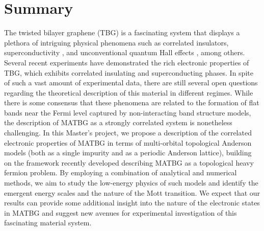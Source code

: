 \documentclass[12pt]{report}
\begin{document}
%
%
\geraTitulo
%
\folhaDeRosto
%
%
%
\tableofcontents
\thispagestyle{empty}
\clearpage
%

\sectionfont{\scshape}



\chapter{Summary} \label{chp:abstract}

The twisted bilayer graphene (TBG) is a fascinating system that displays a plethora of intriguing physical phenomena such as correlated insulators, superconductivity \cite{cao2018}, and unconventional quantum Hall effects \cite{unconv_QHE_tbg_2006}, among others. Several recent experiments have demonstrated the rich electronic properties of TBG, which exhibits correlated insulating and superconducting phases. In spite of such a vast amount of experimental data, there are still several open questions regarding the theoretical description of this material in different regimes. While there is some consensus that these phenomena are related to the formation of flat bands near the Fermi level captured by non-interacting band structure models, the description of MATBG as a strongly correlated system is nonetheless challenging. In this Master's project, we propose a description of the correlated electronic properties of MATBG in terms of multi-orbital topological Anderson models (both as a single impurity and as a periodic Anderson lattice), building on the framework recently developed describing MATBG as a topological heavy fermion problem. By employing a combination of analytical and numerical methods, we aim to study the low-energy physics of such models and identify the emergent energy scales and the nature of the Mott transition. We expect that our results can provide some additional insight into the nature of the electronic states in MATBG and suggest new avenues for experimental investigation of this fascinating material system.
\end{document}
